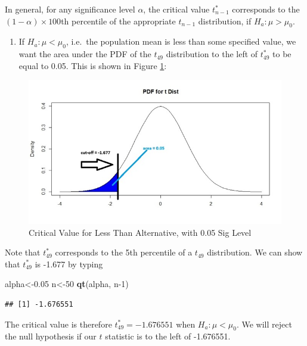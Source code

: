 \documentclass[
]{book}
\newenvironment{Shaded}{\begin{snugshade}}{\end{snugshade}}
\newcommand{\DecValTok}[1]{\textcolor[rgb]{0.00,0.00,0.81}{#1}}
\newcommand{\FloatTok}[1]{\textcolor[rgb]{0.00,0.00,0.81}{#1}}
\newcommand{\FunctionTok}[1]{\textcolor[rgb]{0.13,0.29,0.53}{\textbf{#1}}}
\newcommand{\NormalTok}[1]{#1}
\newcommand{\OtherTok}[1]{\textcolor[rgb]{0.56,0.35,0.01}{#1}}
\providecommand{\tightlist}{%
  \setlength{\itemsep}{0pt}\setlength{\parskip}{0pt}}
\begin{document}
In general, for any significance level \(\alpha\), the critical value \(t_{n-1}^*\) corresponds to the \((1 - \alpha) \times 100\)th percentile of the appropriate \(t_{n-1}\) distribution, if \(H_a: \mu > \mu_0\).

\begin{enumerate}
\def\labelenumi{\arabic{enumi}.}
\setcounter{enumi}{2}
\tightlist
\item
  If \(H_a: \mu < \mu_0\), i.e.~the population mean is less than some specified value, we want the area under the PDF of the \(t_{49}\) distribution to the left of \(t_{49}^*\) to be equal to 0.05. This is shown in Figure \ref{fig:9-critless}:
\end{enumerate}

\begin{figure}
\centering
\includegraphics{images/09-crit_less.jpeg}
\caption{\label{fig:9-critless}Critical Value for Less Than Alternative, with 0.05 Sig Level}
\end{figure}

Note that \(t_{49}^*\) corresponds to the 5th percentile of a \(t_{49}\) distribution. We can show that \(t_{49}^*\) is -1.677 by typing

\begin{Shaded}
\begin{Highlighting}[]
\NormalTok{alpha}\OtherTok{\textless{}{-}}\FloatTok{0.05}
\NormalTok{n}\OtherTok{\textless{}{-}}\DecValTok{50}
\FunctionTok{qt}\NormalTok{(alpha, n}\DecValTok{{-}1}\NormalTok{)}
\end{Highlighting}
\end{Shaded}

\begin{verbatim}
## [1] -1.676551
\end{verbatim}

The critical value is therefore \(t_{49}^* = -1.676551\) when \(H_a: \mu < \mu_0\). We will reject the null hypothesis if our \(t\) statistic is to the left of -1.676551.
\end{document}
